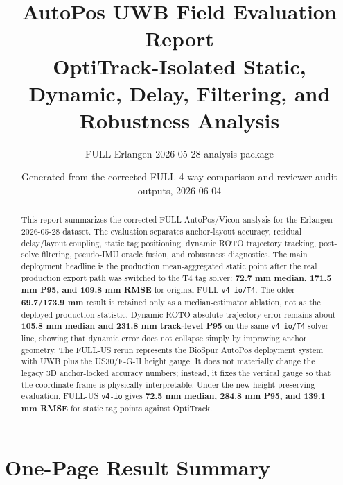 \documentclass[11pt,a4paper]{article}
\title{\textbf{AutoPos UWB Field Evaluation Report}\\
\large OptiTrack-Isolated Static, Dynamic, Delay, Filtering, and Robustness Analysis}
\author{FULL Erlangen 2026-05-28 analysis package}
\date{Generated from the corrected FULL 4-way comparison and reviewer-audit outputs, 2026-06-04}
\newcommand{\case}[1]{\texttt{#1}}
\begin{document}
\maketitle

\begin{abstract}
This report summarizes the corrected FULL AutoPos/Vicon analysis for the Erlangen
2026-05-28 dataset.  The evaluation separates anchor-layout accuracy, residual
delay/layout coupling, static tag positioning, dynamic ROTO trajectory tracking,
post-solve filtering, pseudo-IMU oracle fusion, and robustness diagnostics.  The
main deployment headline is the production mean-aggregated static point after the
real production export path was switched to the T4 tag solver:
\textbf{72.7 mm median, 171.5 mm P95, and 109.8 mm RMSE} for original FULL
\case{v4-io/T4}.  The older \textbf{69.7/173.9 mm} result is retained only as a
median-estimator ablation, not as the deployed production statistic.  Dynamic
ROTO absolute trajectory error remains about \textbf{105.8 mm median and
231.8 mm track-level P95} on the same \case{v4-io/T4} solver line, showing that
dynamic error does not collapse simply by improving anchor geometry.
The FULL-US rerun represents the BioSpur AutoPos deployment system with UWB plus
the US30/F-G-H height gauge.  It does not materially change the legacy 3D
anchor-locked accuracy numbers; instead, it fixes the vertical gauge so that the
coordinate frame is physically interpretable.  Under the new height-preserving
evaluation, FULL-US \case{v4-io} gives \textbf{72.5 mm median, 284.8 mm P95,
and 139.1 mm RMSE} for static tag points against OptiTrack.
\end{abstract}

\section{One-Page Result Summary}
\end{document}
